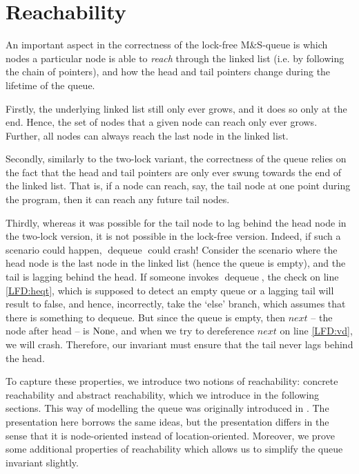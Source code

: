 \documentclass[twoside,11pt,openright]{report}
\newcommand{\dequeue}{\operatorname{dequeue}}
\begin{document}
\section{Reachability}
\label{LFMSQ:section:reachability}

An important aspect in the correctness of the lock-free M\&S-queue is which nodes a particular node is able to \textit{reach} through the linked list (i.e. by following the chain of pointers), and how the head and tail pointers change during the lifetime of the queue.

Firstly, the underlying linked list still only ever grows, and it does so only at the end. Hence, the set of nodes that a given node can reach only ever grows. Further, all nodes can always reach the last node in the linked list.

Secondly, similarly to the two-lock variant, the correctness of the queue relies on the fact that the head and tail pointers are only ever swung towards the end of the linked list. That is, if a node can reach, say, the tail node at one point during the program, then it can reach any future tail nodes.

Thirdly, whereas it was possible for the tail node to lag behind the head node in the two-lock version, it is not possible in the lock-free version. Indeed, if such a scenario could happen, $\dequeue$ could crash! Consider the scenario where the head node is the last node in the linked list (hence the queue is empty), and the tail is lagging behind the head. If someone invokes $\dequeue$, the check on line \ref{LFD:heqt}, which is supposed to detect an empty queue or a lagging tail will result to false, and hence, incorrectly, take the `else' branch, which assumes that there is something to dequeue. But since the queue is empty, then $next$ -- the node after head -- is $\operatorname{None}$, and when we try to dereference $next$ on line \ref{LFD:vd}, we will crash. Therefore, our invariant must ensure that the tail never lags behind the head.

To capture these properties, we introduce two notions of reachability: concrete reachability and abstract reachability, which we introduce in the following sections. This way of modelling the queue was originally introduced in \cite{DBLP:conf/cpp/VindumB21}. The presentation here borrows the same ideas, but the presentation differs in the sense that it is node-oriented instead of location-oriented. Moreover, we prove some additional properties of reachability which allows us to simplify the queue invariant slightly.
\end{document}
